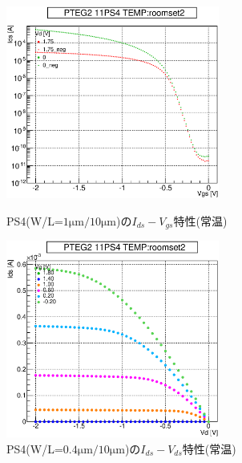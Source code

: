 				\begin{figure}[htbp]
					\begin{minipage}{0.5\hsize}
						\begin{center}
							\includegraphics[width=70mm]{./Chapter/Appendix/Picture/PST/PS4/PTEG2_11_PS4_IdVg_roomset2.eps}
						\end{center}
						\caption{PS4(W/L=$1\mathrm{\mu m}/10\mathrm{\mu m}$)の$I_{ds}-V_{gs}$特性(常温)}
						\label{fig:PS4_IdVg_room}
					\end{minipage}
					\begin{minipage}{0.5\hsize}
						\begin{center}
							\includegraphics[width=70mm]{./Chapter/Appendix/Picture/PST/PS4/PTEG2_11_PS4_IdVd_roomset2.eps}
						\end{center}
						\caption{PS4(W/L=$0.4\mathrm{\mu m}/10\mathrm{\mu m}$)の$I_{ds}-V_{ds}$特性(常温)}
						\label{fig:PS4_IdVd_room}
					\end{minipage}
				\end{figure}
